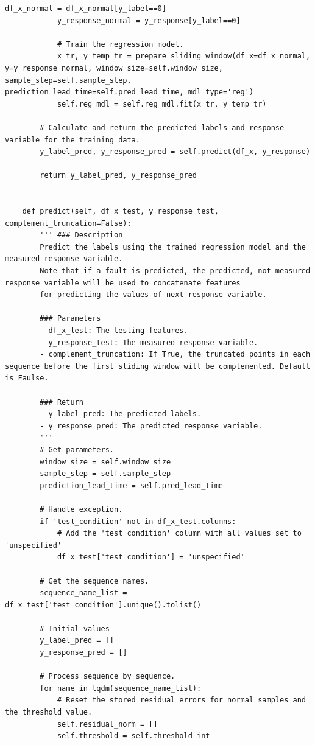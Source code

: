 \documentclass[11pt,a4paper]{article}
\begin{document}
\begin{lstlisting}[style=pyfull]
            df_x_normal = df_x_normal[y_label==0]
            y_response_normal = y_response[y_label==0]

            # Train the regression model.
            x_tr, y_temp_tr = prepare_sliding_window(df_x=df_x_normal, y=y_response_normal, window_size=self.window_size, sample_step=self.sample_step, prediction_lead_time=self.pred_lead_time, mdl_type='reg')
            self.reg_mdl = self.reg_mdl.fit(x_tr, y_temp_tr)

        # Calculate and return the predicted labels and response variable for the training data.
        y_label_pred, y_response_pred = self.predict(df_x, y_response)

        return y_label_pred, y_response_pred


    def predict(self, df_x_test, y_response_test, complement_truncation=False):
        ''' ### Description
        Predict the labels using the trained regression model and the measured response variable.
        Note that if a fault is predicted, the predicted, not measured response variable will be used to concatenate features
        for predicting the values of next response variable.

        ### Parameters
        - df_x_test: The testing features.
        - y_response_test: The measured response variable.
        - complement_truncation: If True, the truncated points in each sequence before the first sliding window will be complemented. Default is Faulse.

        ### Return
        - y_label_pred: The predicted labels.
        - y_response_pred: The predicted response variable.
        '''
        # Get parameters.
        window_size = self.window_size
        sample_step = self.sample_step
        prediction_lead_time = self.pred_lead_time

        # Handle exception.
        if 'test_condition' not in df_x_test.columns:
            # Add the 'test_condition' column with all values set to 'unspecified'
            df_x_test['test_condition'] = 'unspecified'

        # Get the sequence names.
        sequence_name_list = df_x_test['test_condition'].unique().tolist()

        # Initial values
        y_label_pred = []
        y_response_pred = []

        # Process sequence by sequence.
        for name in tqdm(sequence_name_list):
            # Reset the stored residual errors for normal samples and the threshold value.
            self.residual_norm = []
            self.threshold = self.threshold_int


\end{lstlisting}
\end{document}
